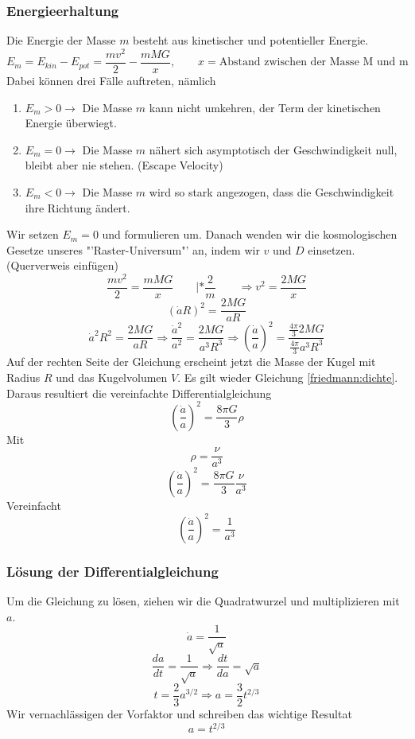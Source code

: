\begin{refsection}
\subsubsection{Energieerhaltung}
Die Energie der Masse $m$ besteht aus kinetischer und potentieller Energie.
\begin{equation}
E_m = E_{kin} - E_{pot} =  \frac{m v^2}{2} - \frac{m M G }{x}, \qquad x = \text{Abstand zwischen der Masse M und m}
\end{equation}
Dabei können drei Fälle auftreten, nämlich
\begin{enumerate}
	\item $E_m > 0 \rightarrow$ Die Masse $m$ kann nicht umkehren, der Term der kinetischen Energie überwiegt.
	\item $E_m = 0 \rightarrow$ Die Masse $m$ nähert sich asymptotisch  der Geschwindigkeit null, bleibt aber nie stehen. (Escape Velocity)
	\item $E_m < 0 \rightarrow$ Die Masse $m$ wird so stark angezogen, dass die Geschwindigkeit ihre Richtung ändert.
\end{enumerate}
Wir setzen $E_m = 0$ und formulieren um. Danach wenden wir die kosmologischen Gesetze unseres "'Raster-Universum"' an, indem wir $v$ und $D$ einsetzen. (Querverweis einfügen)
\[\frac{m v^2}{2} = \frac{m M G}{x} \qquad| *\frac{2}{m} \qquad \Rightarrow {v^2} = \frac{2 M G}{x}\]
\[\left( \dot{a} R\right)^2 = \frac{2 M G}{a R}\] 
\[\dot{a}^2 R^2= \frac{2 M G}{a R} \Rightarrow \frac{\dot{a}^2}{a^2} = \frac{2 M G}{a^3 R^3} \Rightarrow \left(\frac{\dot{a}}{a} \right)^2 = \frac{\frac{4 \pi}{3}2 M G}{\frac{4 \pi}{3} a^3 R^3} \] %
Auf der rechten Seite der Gleichung erscheint jetzt die Masse der Kugel mit Radius $R$ und das Kugelvolumen $V$. Es gilt wieder Gleichung \ref{friedmann:dichte}. Daraus resultiert die vereinfachte Differentialgleichung 
\begin{equation}
\left(\frac{\dot{a}}{a} \right)^2 = \frac{8 \pi G}{3} \rho
\end{equation}
Mit \[\rho = \frac{\nu}{a^3}\]
\begin{equation}
\left(\frac{\dot{a}}{a} \right)^2 = \frac{8 \pi G}{3} \frac{\nu}{a^3}
\end{equation}
Vereinfacht
\begin{equation}
\left(\frac{\dot{a}}{a} \right)^2 = \frac{1}{a^3}
\end{equation}

\subsubsection{Lösung der Differentialgleichung}
Um die Gleichung zu lösen, ziehen wir die Quadratwurzel und multiplizieren mit $a$.
\[ \dot{a} = \frac{1}{\sqrt{a}} \]
\[\frac{da}{dt} =\frac{1}{\sqrt{a}} \Rightarrow \frac{dt}{da} = \sqrt{a} \]
\[ t = \frac{2}{3} a^{3/2} \Rightarrow a = \frac{3}{2} t^{2/3} \]
Wir vernachlässigen der Vorfaktor und schreiben das wichtige Resultat
\begin{equation}
a = t^{2/3}
\end{equation}

	
\end{refsection}
